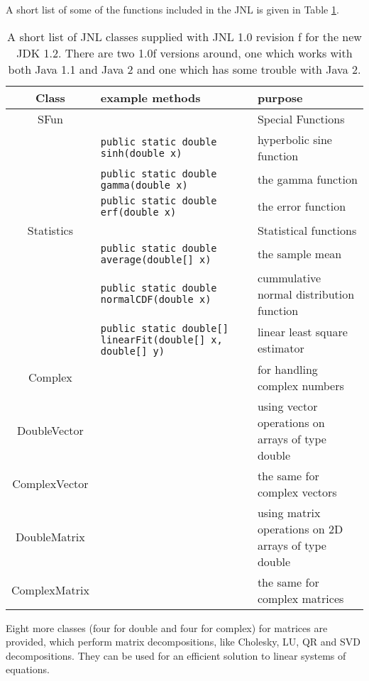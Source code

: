 A short list of some of the functions included in the JNL is
given in Table \ref{tab:JNL}.
\begin{landscape}
\begin{table}[htbp]
    \begin{tabular}{>{\large}c||>{\scriptsize}l|l}
      \textbf{Class}  & \normalsize\textbf{example methods} & \textbf{purpose} \\\hline\hline
      SFun &  & Special Functions \\
           & \verb|public static double sinh(double x)| & hyperbolic sine function \\
           & \verb|public static double gamma(double x)| & the gamma function \\
           & \verb|public static double erf(double x)| & the error function \\\hline
      Statistics &  & Statistical functions \\
           & \verb|public static double average(double[] x)| & the sample mean\\
           & \verb|public static double normalCDF(double x)| & 
                             cummulative normal distribution function\\
           & \verb|public static double[] linearFit(double[] x, double[] y)| &
                             linear least square estimator \\\hline
      Complex &  & for handling complex numbers \\\hline
      DoubleVector &  & using vector operations on arrays of type double\\
      ComplexVector & & the same for complex vectors \\\hline 
      DoubleMatrix &  & using matrix operations on 2D arrays of type double\\
      ComplexMatrix & & the same for complex matrices \\\hline 
    \end{tabular}
    \caption{A short list of JNL classes supplied with JNL 1.0 revision f %
      for the new JDK 1.2. There are two 1.0f versions around, one which %
      works with both Java 1.1 and Java 2 and one which has some trouble %
      with Java 2.}
    \label{tab:JNL}
\end{table}
\end{landscape}
Eight more classes (four for double and four for complex) for
matrices are provided, which perform matrix decompositions,
like Cholesky, LU, QR and SVD decompositions. They can be
used for an efficient solution to linear systems of equations.
 
